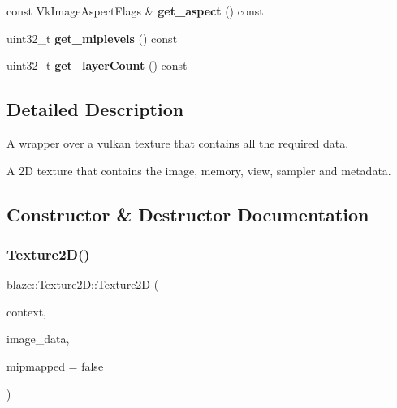 \begin{Indent}
\begin{DoxyCompactItemize}
\mbox{\label{classblaze_1_1Texture2D_a1e19506b9f45670b71432a4b0fb90269}} 
const Vk\+Image\+Aspect\+Flags \& {\bfseries get\+\_\+aspect} () const
\item 
\mbox{\label{classblaze_1_1Texture2D_a76d9dc00563db38ebd45a0e8a36c10e8}} 
uint32\+\_\+t {\bfseries get\+\_\+miplevels} () const
\item 
\mbox{\label{classblaze_1_1Texture2D_a83a2c19482249263e2f1cec9e9f4698e}} 
uint32\+\_\+t {\bfseries get\+\_\+layer\+Count} () const
\end{DoxyCompactItemize}
\end{Indent}


\subsection{Detailed Description}
A wrapper over a vulkan texture that contains all the required data. 

A 2D texture that contains the image, memory, view, sampler and metadata. 

\subsection{Constructor \& Destructor Documentation}
\mbox{\label{classblaze_1_1Texture2D_abf1fad7d391f59d068c13683c3fe014a}} 
\subsubsection{\texorpdfstring{Texture2\+D()}{Texture2D()}}
{\footnotesize\ttfamily blaze\+::\+Texture2\+D\+::\+Texture2D (\begin{DoxyParamCaption}\item[{const \hyperlink{classblaze_1_1Context}{Context} \&}]{context,  }\item[{const \hyperlink{structblaze_1_1ImageData2D}{Image\+Data2D} \&}]{image\+\_\+data,  }\item[{bool}]{mipmapped = {\ttfamily false} }\end{DoxyParamCaption})}



